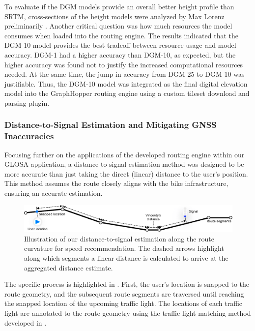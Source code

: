 To evaluate if the DGM models provide an overall better height profile than SRTM, cross-sections of the height models were analyzed by Max Lorenz preliminarily \cite{lorenz_2022}. Another critical question was how much resources the model consumes when loaded into the routing engine. The results indicated that the DGM-10 model provides the best tradeoff between resource usage and model accuracy. DGM-1 had a higher accuracy than DGM-10, as expected, but the higher accuracy was found not to justify the increased computational resources needed. At the same time, the jump in accuracy from DGM-25 to DGM-10 was justifiable. Thus, the DGM-10 model was integrated as the final digital elevation model into the GraphHopper routing engine using a custom tileset download and parsing plugin.

\subsubsection{Distance-to-Signal Estimation and Mitigating GNSS Inaccuracies}

Focusing further on the applications of the developed routing engine within our GLOSA application, a distance-to-signal estimation method was designed to be more accurate than just taking the direct (linear) distance to the user's position. This method assumes the route closely aligns with the bike infrastructure, ensuring an accurate estimation.

\begin{figure}[t]
\centering
\includegraphics[width=\linewidth]{images/distance-to-signal-estimation.pdf}
\caption{Illustration of our distance-to-signal estimation along the route curvature for speed recommendation. The dashed arrows highlight along which segments a linear distance is calculated to arrive at the aggregated distance estimate.}
\label{fig:distance-to-signal-estimation}
\end{figure}

The specific process is highlighted in . First, the user's location is snapped to the route geometry, and the subsequent route segments are traversed until reaching the snapped location of the upcoming traffic light. The locations of each traffic light are annotated to the route geometry using the traffic light matching method developed in .

